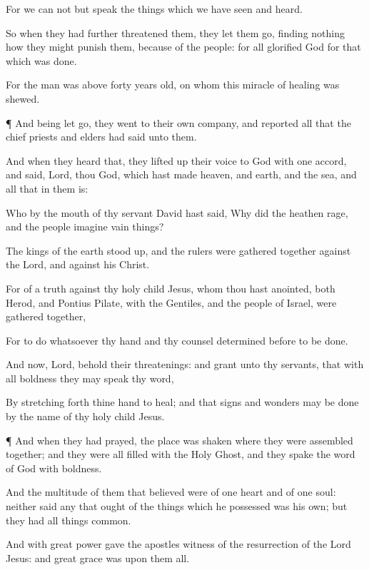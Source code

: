 {For
we
can
not
but
speak the things
which we have
seen
and
heard.

So when they had further
threatened
them, they let them
go,
finding
nothing
how they might
punish
them, because
of the
people:
for
all
{}
glorified
God
for
that which was
done.

For the
man
was
above
forty years
old,
on
whom
this
miracle of
healing was
shewed.


\par }{\PP {}¶
And being let
go, they
went
to their own
company,
and
reported all
that the chief
priests
and
elders had
said
unto
them.

And when they
heard
that, they lifted
up their
voice
to
God with one
accord,
and
said,
Lord,
thou
{}
God,
which hast
made
heaven,
and
earth,
and the
sea,
and
all
that
in
them
is:

Who
by the
mouth of
thy
servant
David hast
said,
Why
did the
heathen
rage,
and the
people
imagine vain
things?

The
kings of the
earth stood
up,
and the
rulers were
gathered
together
against the
Lord,
and
against
his
Christ.

For of a
truth
against
thy
holy
child
Jesus,
whom thou hast
anointed,
both
Herod,
and
Pontius
Pilate,
with the
Gentiles,
and the
people of
Israel, were
gathered
together,

For to
do
whatsoever
thy
hand
and
thy
counsel determined
before to be
done.

And
now,
Lord,
behold
their
threatenings:
and
grant
unto
thy
servants, that
with
all
boldness they may
speak
thy
word,

By stretching
forth
thine
hand
to
heal;
and
that
signs
and
wonders may be
done
by the
name
of
thy
holy
child
Jesus.


\par }{\PP {}¶
And
when
they had
prayed, the
place was
shaken
where they
were assembled
together;
and they
were
all
filled with
the
Holy
Ghost,
and they
spake the
word of
God
with
boldness.

And the
multitude of
them
that
believed
were
of
one
heart
and
of
one
soul:
neither
said
any
{}
that ought of the things which he
possessed
was
his
own;
but
they
had all
things
common.

And
with
great
power
gave the
apostles
witness of the
resurrection of the
Lord
Jesus:
and
great
grace
was
upon
them
all.

}

